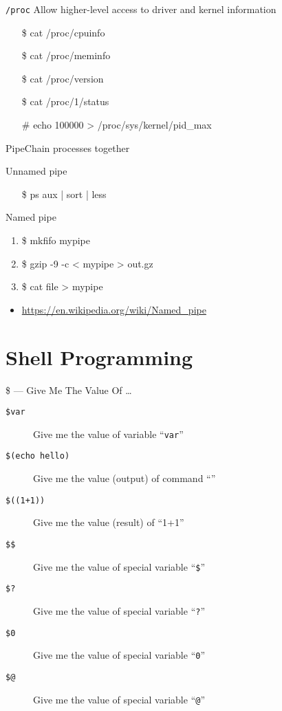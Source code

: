 \begin{frame}{\texttt{/proc}}
  Allow higher-level access to driver and kernel information
  \ttfamily
  \begin{itemize}
  \item[\$] cat /proc/cpuinfo
  \item[\$] cat /proc/meminfo
  \item[\$] cat /proc/version
  \item[\$] cat /proc/1/status
  \item[\#] echo 100000 > /proc/sys/kernel/pid\_max
  \end{itemize}
\end{frame}

\begin{frame}{Pipe}{Chain processes together}
  \begin{block}{Unnamed pipe}\ttfamily
    \begin{itemize}
    \item[\$] ps aux | sort | less
    \end{itemize}
  \end{block}
  \begin{block}{Named pipe}\ttfamily
    \begin{enumerate}
    \item \alert{\$} mkfifo mypipe
    \item \alert{\$} gzip -9 -c < mypipe > out.gz
    \item \alert{\$} cat file > mypipe
    \end{enumerate}
  \end{block}  
\end{frame}

\begin{itemize}
\item \url{https://en.wikipedia.org/wiki/Named_pipe}
\end{itemize}

\section{Shell Programming}
\label{sec:shell-programming}

\begin{frame}{\$ --- Give Me The Value Of \ldots}
  \begin{description}
  \item[\texttt{\$var}] Give me the value of variable ``\texttt{var}''
  \item[\texttt{\$(echo hello)}] Give me the value (output) of command ``''
  \item[\texttt{\$((1+1))}] Give me the value (result) of ``1+1''
  \item[\texttt{\$\$}] Give me the value of special variable ``\texttt{\$}''
  \item[\texttt{\$?}] Give me the value of special variable ``\texttt{?}''
  \item[\texttt{\$0}] Give me the value of special variable ``\texttt{0}''
  \item[\texttt{\$@}] Give me the value of special variable ``\texttt{@}''
  \end{description}
\end{frame}

